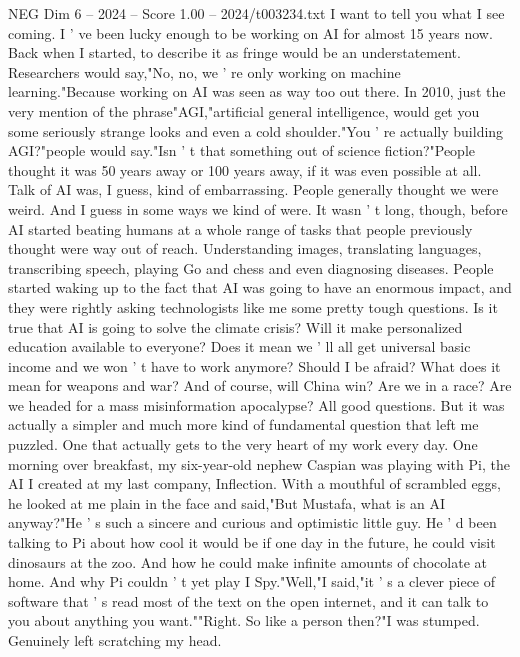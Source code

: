 \begin{textsample}{NEG Dim 6 – 2024 – Score 1.00 – 2024/t003234.txt}  \label{ex:f6_neg_005}
I want to tell you what I see coming.
I ' ve been lucky enough to be working on AI for almost 15 years now.
Back when I started, to describe it as fringe would be an understatement.
Researchers would say,"No, no, we ' re only working on machine learning."Because working on AI was seen as way too out there.
In 2010, just the very mention of the phrase"AGI,"artificial general intelligence, would get you some seriously strange looks and even a cold shoulder."You ' re actually building AGI?"people would say."Isn ' t that something out of science fiction?"People thought it was 50 years away or 100 years away, if it was even possible at all.
Talk of AI was, I guess, kind of embarrassing.
People generally thought we were weird.
And I guess in some ways we kind of were.
It wasn ' t long, though, before AI started beating humans at a whole range of tasks that people previously thought were way out of reach.
Understanding images, translating languages, transcribing speech, playing Go and chess and even diagnosing diseases.
People started waking up to the fact that AI was going to have an enormous impact, and they were rightly asking technologists like me some pretty tough questions.
Is it true that AI is going to solve the climate crisis?
Will it make personalized education available to everyone?
Does it mean we ' ll all get universal basic income and we won ' t have to work anymore?
Should I be afraid?
What does it mean for weapons and war?
And of course, will China win?
Are we in a race?
Are we headed for a mass misinformation apocalypse?
All good questions.
But it was actually a simpler and much more kind of fundamental question that left me puzzled.
One that actually gets to the very heart of my work every day.
One morning over breakfast, my six-year-old nephew Caspian was playing with Pi, the AI I created at my last company, Inflection.
With a mouthful of scrambled eggs, he looked at me plain in the face and said,"But Mustafa, what is an AI anyway?"He ' s such a sincere and curious and optimistic little guy.
He ' d been talking to Pi about how cool it would be if one day in the future, he could visit dinosaurs at the zoo.
And how he could make infinite amounts of chocolate at home.
And why Pi couldn ' t yet play I Spy."Well,"I said,"it ' s a clever piece of software that ' s read most of the text on the open internet, and it can talk to you about anything you want.""Right.
So like a person then?"I was stumped.
Genuinely left scratching my head.

\end{textsample}
